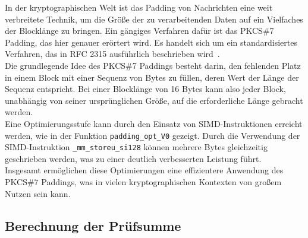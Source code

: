 In der kryptographischen Welt ist das Padding von Nachrichten eine weit verbreitete
Technik, um die Größe der zu verarbeitenden Daten auf ein Vielfaches der Blocklänge
zu bringen.
Ein gängiges Verfahren dafür ist das PKCS\#7 Padding, das hier genauer
erörtert wird.
Es handelt sich um ein standardisiertes Verfahren, das in RFC 2315
ausführlich beschrieben wird~\cite{rfc2315}.
\\
Die grundlegende Idee des PKCS\#7 Paddings besteht darin, den fehlenden Platz in
einem Block mit einer Sequenz von Bytes zu füllen, deren Wert der Länge der
Sequenz entspricht.
Bei einer Blocklänge von 16 Bytes kann also jeder Block,
unabhängig von seiner ursprünglichen Größe, auf die erforderliche Länge gebracht werden.
\\
Eine Optimierungsstufe kann durch den Einsatz von SIMD-Instruktionen erreicht
werden, wie in der Funktion \texttt{padding\_opt\_V0} gezeigt.
Durch die Verwendung
der SIMD-Instruktion \texttt{\_mm\_storeu\_si128} können mehrere Bytes gleichzeitig
geschrieben werden, was zu einer deutlich verbesserten Leistung führt.
\\
Insgesamt ermöglichen diese Optimierungen eine effizientere Anwendung des PKCS\#7
Paddings, was in vielen kryptographischen Kontexten von großem Nutzen sein kann.

\subsection{Berechnung der Prüfsumme}

